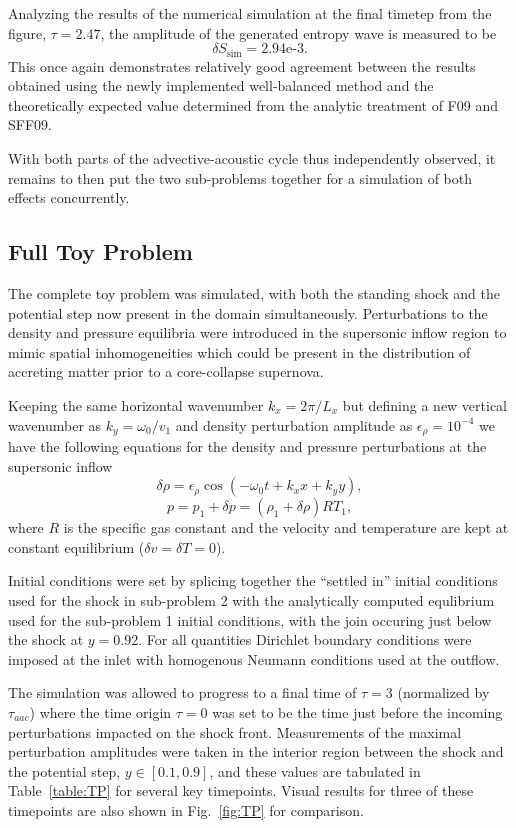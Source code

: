 Analyzing the results of the numerical simulation at the final timetep from the figure, $\tau=2.47$, the amplitude of the generated entropy wave is measured to be $$\delta S_\textrm{sim}=2.94\textrm{e-}3.$$ This once again demonstrates relatively good agreement between the results obtained using the newly implemented well-balanced method and the theoretically expected value determined from the analytic treatment of F09 and SFF09.

With both parts of the advective-acoustic cycle thus independently observed, it remains to then put the two sub-problems together for a simulation of both effects concurrently.

\subsection{Full Toy Problem}
\label{subsec:results_TP}

The complete toy problem was simulated, with both the standing shock and the potential step now present in the domain simultaneously. Perturbations to the density and pressure equilibria were introduced in the supersonic inflow region to mimic spatial inhomogeneities which could be present in the distribution of accreting matter prior to a core-collapse supernova.

Keeping the same horizontal wavenumber $k_x=2\pi/L_x$ but defining a new vertical wavenumber as $k_y=\omega_0/v_1$ and density perturbation amplitude as $\epsilon_\rho=10^{-4}$ we have the following equations for the density and pressure perturbations at the supersonic inflow
\begin{equation}
\delta\rho=\epsilon_\rho\cos\left(-\omega_0t+k_xx+k_yy\right),
\end{equation}
\begin{equation}
p=p_1+\delta p=(\rho_1+\delta\rho)RT_1,
\end{equation}
where $R$ is the specific gas constant and the velocity and temperature are kept at constant equilibrium ($\delta v=\delta T=0$).

Initial conditions were set by splicing together the ``settled in'' initial conditions used for the shock in sub-problem 2 with the analytically computed equlibrium used for the sub-problem 1 initial conditions, with the join occuring just below the shock at $y=0.92$. For all quantities Dirichlet boundary conditions were imposed at the inlet with homogenous Neumann conditions used at the outflow.

The simulation was allowed to progress to a final time of $\tau=3$ (normalized by $\tau_{aac}$) where the time origin $\tau=0$ was set to be the time just before the incoming perturbations impacted on the shock front. Measurements of the maximal perturbation amplitudes were taken in the interior region between the shock and the potential step, $y\in[0.1,0.9]$, and these values are tabulated in Table~\ref{table:TP} for several key timepoints. Visual results for three of these timepoints are also shown in Fig.~\ref{fig:TP} for comparison.

